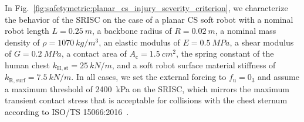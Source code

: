In Fig.~\ref{fig:safetymetric:planar_cs_injury_severity_criterion}, we characterize the behavior of the \gls{SRISC} on the case of a planar \gls{CS} soft robot with a nominal robot length $L = \SI{0.25}{m}$, a backbone radius of $R = \SI{0.02}{m}$, a nominal mass density of $\rho = \SI{1070}{kg \per m^3}$, an elastic modulus of $E = \SI{0.5}{MPa}$, a shear modulus of $G = \SI{0.2}{MPa}$, a contact area of $A_\mathrm{c} = \SI{1.5}{cm^2}$, the spring constant of the human chest $k_\mathrm{H,st} = \SI{25}{kN \per m}$, and a soft robot surface material stiffness of $k_{\mathrm{R,surf}} = \SI{7.5}{kN \per m}$.
In all cases, we set the external forcing to $f_\mathrm{u} = 0_3$ and assume a maximum threshold of \SI{2400}{kPa} on the \gls{SRISC}, which mirrors the maximum transient contact stress that is acceptable for collisions with the chest sternum according to ISO/TS 15066:2016~\citep{iso2016collaborative}.
